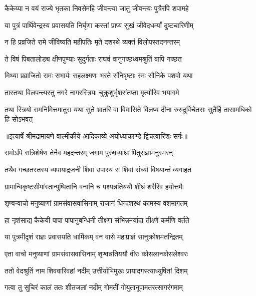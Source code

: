 \twolineshloka
{कैकेय्या न वयं राज्ये भृतका निवसेमहि}
{जीवन्त्या जातु जीवन्त्यः पुत्रैरपि शपामहे} %

\twolineshloka
{या पुत्रं पार्थिवेन्द्रस्य प्रवासयति निर्घृणा}
{कस्तां प्राप्य सुखं जीवेदधर्म्यां दुष्टचारिणीम्} %

\twolineshloka
{न हि प्रव्रजिते रामे जीविष्यति महीपतिः}
{मृते दशरथे व्यक्तं विलोपस्तदनन्तरम्} %

\twolineshloka
{ते विषं पिबतालोड्य क्षीणपुण्याः सुदुर्गताः}
{राघवं वानुगच्छध्वमश्रुतिं वापि गच्छत} %

\twolineshloka
{मिथ्या प्रव्राजितो रामः सभार्यः सहलक्ष्मणः}
{भरते संनिषृष्टाः स्मः सौनिके पशवो यथा} %

\twolineshloka
{तास्तथा विलपन्त्यस्तु नगरे नागरस्त्रियः}
{चुक्रुशुर्भृशसंतप्ता मृत्योरिव भयागमे} %

\fourlineindentedshloka
{तथा स्त्रियो रामनिमित्तमातुरा}
{ यथा सुते भ्रातरि वा विवासिते}
{विलप्य दीना रुरुदुर्विचेतसः}
{ सुतैर्हि तासामधिको हि सोऽभवत्} %


{॥इत्यार्षे श्रीमद्रामायणे वाल्मीकीये आदिकाव्ये अयोध्याकाण्डे द्विचत्वारिंशः सर्गः॥}


\twolineshloka
{रामोऽपि रात्रिशेषेण तेनैव महदन्तरम्}
{जगाम पुरुषव्याघ्रः पितुराज्ञामनुस्मरन्} %

\twolineshloka
{तथैव गच्छतस्तस्य व्यपायाद्रजनी शिवा}
{उपास्य स शिवां संध्यां विषयान्तं व्यगाहत} %

\twolineshloka
{ग्रामान्विकृष्टसीमांस्तान्पुष्पितानि वनानि च}
{पश्यन्नतिययौ शीघ्रं शरैरिव हयोत्तमैः} %

\twolineshloka
{शृण्वन्वाचो मनुष्याणां ग्रामसंवासवासिनाम्}
{राजानं धिग्दशरथं कामस्य वशमागतम्} %

\twolineshloka
{हा नृशंसाद्य कैकेयी पापा पापानुबन्धिनी}
{तीक्ष्णा संभिन्नमर्यादा तीक्ष्णे कर्मणि वर्तते} %

\twolineshloka
{या पुत्रमीदृशं राज्ञः प्रवासयति धार्मिकम्}
{वन वासे महाप्राज्ञं सानुक्रोशमतन्द्रितम्} %

\twolineshloka
{एता वाचो मनुष्याणां ग्रामसंवासवासिनाम्}
{शृण्वन्नतिययौ वीरः कोसलान्कोसलेश्वरः} %

\twolineshloka
{ततो वेदश्रुतिं नाम शिववारिवहां नदीम्}
{उत्तीर्याभिमुखः प्रायादगस्त्याध्युषितां दिशम्} %

\twolineshloka
{गत्वा तु सुचिरं कालं ततः शीतजलां नदीम्}
{गोमतीं गोयुतानूपामतरत्सागरंगमाम्} %

